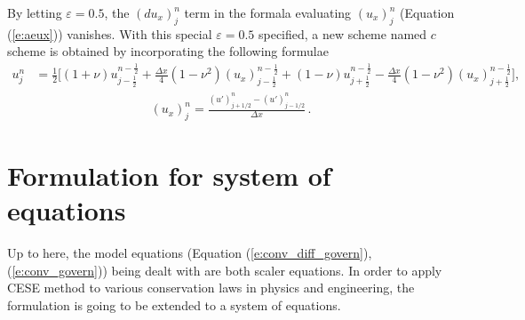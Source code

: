 \documentclass[letterpaper,12pt,dvips]{article}
\numberwithin{equation}{section}
\begin{document}
By letting $\varepsilon=0.5$, the $(du_x)_j^n$ term in the formala 
evaluating $(u_x)_j^n$ (Equation (\ref{e:aeux})) vanishes.
With this special $\varepsilon=0.5$ specified, a new scheme named $c$ 
scheme is obtained by incorporating the following formulae
\begin{align}
  u_j^n &= \frac{1}{2}\Big[
      (1+\nu)u_{j-\frac{1}{2}}^{n-\frac{1}{2}} 
    + \frac{\Delta x}{4}(1-\nu^2)(u_x)_{j-\frac{1}{2}}^{n-\frac{1}{2}}
    + (1-\nu)u_{j+\frac{1}{2}}^{n-\frac{1}{2}}
    - \frac{\Delta x}{4}(1-\nu^2)(u_x)_{j+\frac{1}{2}}^{n-\frac{1}{2}}
  \Big], \label{e:cu}
\end{align}
\begin{align}
  (u_x)_j^n = \frac{(u')_{j+1/2}^n - (u')_{j-1/2}^n}{\Delta x}
  \,. \label{e:cux}
\end{align}

\section{Formulation for system of equations}
\label{s:system_eqn}

Up to here, the model equations (Equation (\ref{e:conv_diff_govern}), 
(\ref{e:conv_govern})) being dealt with are both scaler equations.
In order to apply CESE method to various conservation laws in physics 
and engineering, the formulation is going to be extended to a system 
of equations.
\end{document}
